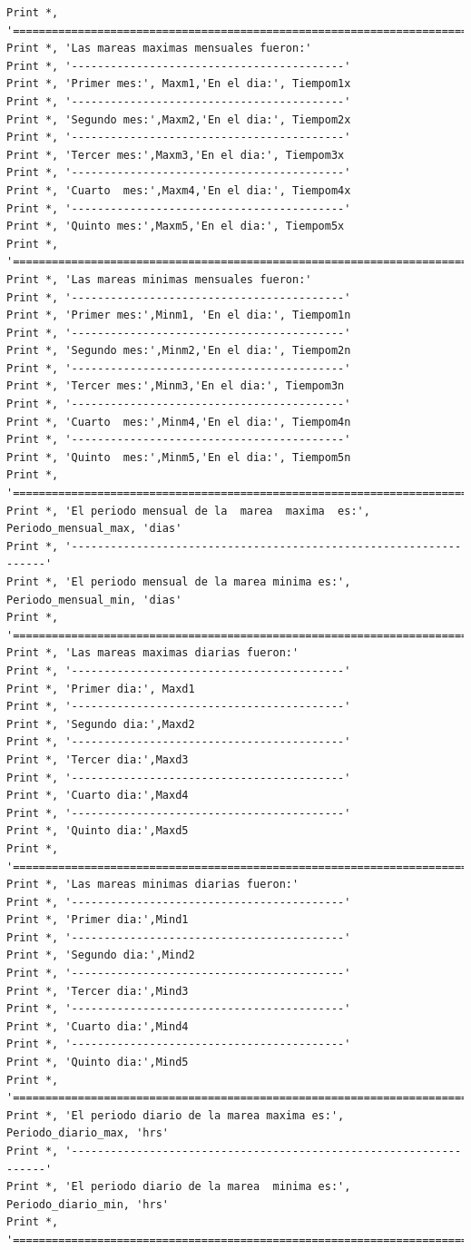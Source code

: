 \documentclass[10pt]{article}
\begin{document}
\begin{verbatim}
Print *, '========================================================================'
Print *, 'Las mareas maximas mensuales fueron:'
Print *, '------------------------------------------'       
Print *, 'Primer mes:', Maxm1,'En el dia:', Tiempom1x
Print *, '------------------------------------------'
Print *, 'Segundo mes:',Maxm2,'En el dia:', Tiempom2x
Print *, '------------------------------------------'              
Print *, 'Tercer mes:',Maxm3,'En el dia:', Tiempom3x
Print *, '------------------------------------------'
Print *, 'Cuarto  mes:',Maxm4,'En el dia:', Tiempom4x
Print *, '------------------------------------------'              
Print *, 'Quinto mes:',Maxm5,'En el dia:', Tiempom5x
Print *, '========================================================================'
Print *, 'Las mareas minimas mensuales fueron:'
Print *, '------------------------------------------'       
Print *, 'Primer mes:',Minm1, 'En el dia:', Tiempom1n
Print *, '------------------------------------------'
Print *, 'Segundo mes:',Minm2,'En el dia:', Tiempom2n
Print *, '------------------------------------------'              
Print *, 'Tercer mes:',Minm3,'En el dia:', Tiempom3n
Print *, '------------------------------------------'
Print *, 'Cuarto  mes:',Minm4,'En el dia:', Tiempom4n
Print *, '------------------------------------------'              
Print *, 'Quinto  mes:',Minm5,'En el dia:', Tiempom5n
Print *, '========================================================================'
Print *, 'El periodo mensual de la  marea  maxima  es:', Periodo_mensual_max, 'dias'
Print *, '------------------------------------------------------------------'
Print *, 'El periodo mensual de la marea minima es:', Periodo_mensual_min, 'dias'
Print *, '========================================================================'
Print *, 'Las mareas maximas diarias fueron:'
Print *, '------------------------------------------'       
Print *, 'Primer dia:', Maxd1
Print *, '------------------------------------------'
Print *, 'Segundo dia:',Maxd2
Print *, '------------------------------------------'              
Print *, 'Tercer dia:',Maxd3
Print *, '------------------------------------------'
Print *, 'Cuarto dia:',Maxd4
Print *, '------------------------------------------'              
Print *, 'Quinto dia:',Maxd5
Print *, '========================================================================'
Print *, 'Las mareas minimas diarias fueron:'
Print *, '------------------------------------------'       
Print *, 'Primer dia:',Mind1
Print *, '------------------------------------------'
Print *, 'Segundo dia:',Mind2
Print *, '------------------------------------------'              
Print *, 'Tercer dia:',Mind3
Print *, '------------------------------------------'
Print *, 'Cuarto dia:',Mind4
Print *, '------------------------------------------'              
Print *, 'Quinto dia:',Mind5
Print *, '========================================================================'
Print *, 'El periodo diario de la marea maxima es:', Periodo_diario_max, 'hrs'
Print *, '------------------------------------------------------------------'
Print *, 'El periodo diario de la marea  minima es:', Periodo_diario_min, 'hrs' 
Print *, '========================================================================'



\end{verbatim}
\end{document}
